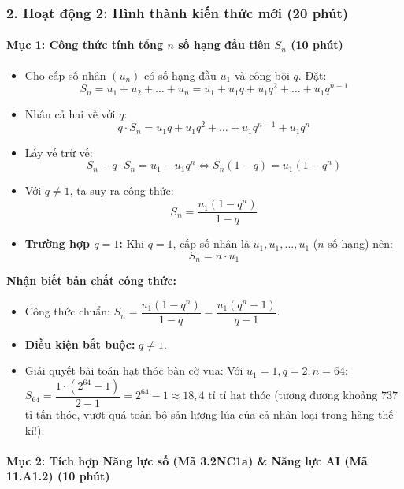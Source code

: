 \documentclass[12pt, a4paper]{article}
\begin{document}
\subsubsection*{2. Hoạt động 2: Hình thành kiến thức mới (20 phút)}


\paragraph{Mục 1: Công thức tính tổng $n$ số hạng đầu tiên $S_n$ (10 phút)}
\begin{itemize}
    \item Cho cấp số nhân $(u_n)$ có số hạng đầu $u_1$ và công bội $q$.
    Đặt:
    $$S_n = u_1 + u_2 + \dots + u_n = u_1 + u_1 q + u_1 q^2 + \dots + u_1 q^{n-1}$$
    \item Nhân cả hai vế với $q$:
    $$q \cdot S_n = u_1 q + u_1 q^2 + \dots + u_1 q^{n-1} + u_1 q^n$$
    \item Lấy vế trừ vế:
    $$S_n - q \cdot S_n = u_1 - u_1 q^n \iff S_n(1 - q) = u_1(1 - q^n)$$
    \item Với $q \neq 1$, ta suy ra công thức:
    $$S_n = \dfrac{u_1(1 - q^n)}{1 - q}$$
    \item \textbf{Trường hợp $q = 1$:} Khi $q = 1$, cấp số nhân là $u_1, u_1, \dots, u_1$ ($n$ số hạng) nên:
    $$S_n = n \cdot u_1$$
\end{itemize}


\begin{scaffoldbox}
    \textbf{Nhận biết bản chất công thức:}
    \begin{itemize}
        \item Công thức chuẩn: $S_n = \dfrac{u_1(1 - q^n)}{1 - q} = \dfrac{u_1(q^n - 1)}{q - 1}$.
        \item \textbf{Điều kiện bắt buộc:} $q \neq 1$.
        \item Giải quyết bài toán hạt thóc bàn cờ vua: Với $u_1 = 1, q = 2, n = 64$:\\
        $S_{64} = \dfrac{1 \cdot (2^{64} - 1)}{2 - 1} = 2^{64} - 1 \approx 18{,}4\text{ tỉ tỉ hạt thóc}$ (tương đương khoảng $737$ tỉ tấn thóc, vượt quá toàn bộ sản lượng lúa của cả nhân loại trong hàng thế kỉ!).
    \end{itemize}
\end{scaffoldbox}


\paragraph{Mục 2: Tích hợp Năng lực số (Mã 3.2NC1a) & Năng lực AI (Mã 11.A1.2) (10 phút)}
\end{document}
